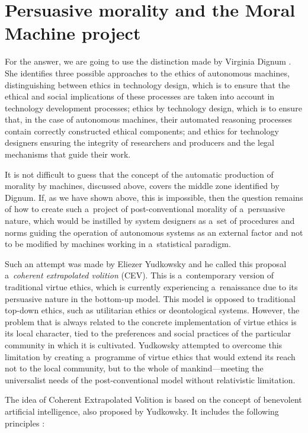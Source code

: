 \section*{Persuasive morality and the Moral Machine project}
For the answer, we are going to use the distinction made by Virginia Dignum
\parencite*[][]{dignum_responsible_2022}. %
 She identifies three possible approaches to the ethics of autonomous machines, distinguishing between ethics in technology design, which is to ensure that the ethical and social implications of these processes are taken into account in technology development processes; ethics by technology design, which is to ensure that, in the case of autonomous machines, their automated reasoning processes contain correctly constructed ethical components; and ethics for technology designers ensuring the integrity of researchers and producers and the legal mechanisms that guide their work.

It is not difficult to guess that the concept of the automatic production of morality by machines, discussed above, covers the middle zone identified by Dignum. If, as we have shown above, this is impossible, then the question remains of how to create such a~project of post-conventional morality of a~persuasive nature, which would be instilled by system designers as a~set of procedures and norms guiding the operation of autonomous systems as an external factor and not to be modified by machines working in a~statistical paradigm.

Such an attempt was made by Eliezer Yudkowsky
\parencite*[][]{yudkowsky_coherent_2004} %
 and he called this proposal a~\textit{coherent extrapolated volition} (CEV). This is a~contemporary version of traditional virtue ethics, which is currently experiencing a~renaissance due to its persuasive nature in the bottom-up model. This model is opposed to traditional top-down ethics, such as utilitarian ethics or deontological systems. However, the problem that is always related to the concrete implementation of virtue ethics is its local character, tied to the preferences and social practices of the particular community in which it is cultivated. Yudkowsky attempted to overcome this limitation by creating a~programme of virtue ethics that would extend its reach not to the local community, but to the whole of mankind—meeting the universalist needs of the post-conventional model without relativistic limitation.

The idea of Coherent Extrapolated Volition is based on the concept of benevolent artificial intelligence, also proposed by Yudkowsky. It includes the following principles
\parencite[][]{yudkowsky_coherent_2004}:%


